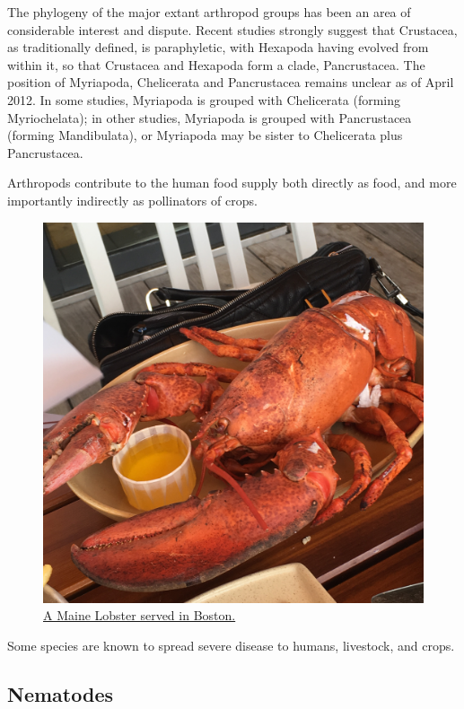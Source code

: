 The phylogeny of the major extant arthropod groups has been an area of considerable interest and dispute. Recent studies strongly suggest that Crustacea, as traditionally defined, is paraphyletic, with Hexapoda having evolved from within it, so that Crustacea and Hexapoda form a clade, Pancrustacea. The position of Myriapoda, Chelicerata and Pancrustacea remains unclear as of April 2012. In some studies, Myriapoda is grouped with Chelicerata (forming Myriochelata); in other studies, Myriapoda is grouped with Pancrustacea (forming Mandibulata), or Myriapoda may be sister to Chelicerata plus Pancrustacea.

Arthropods contribute to the human food supply both directly as food, and more importantly indirectly as pollinators of crops.



\begin{figure}

{\centering \includegraphics[width=0.7\linewidth]{./figures/animals/Lobster_in_Boston} 

}

\caption{\href{https://commons.wikimedia.org/wiki/File:Lobster_in_Boston.jpg}{A Maine Lobster served in Boston.}}\label{fig:lobster}
\end{figure}

Some species are known to spread severe disease to humans, livestock, and crops.

\hypertarget{nematodes}{%
\subsection{Nematodes}\label{nematodes}}

